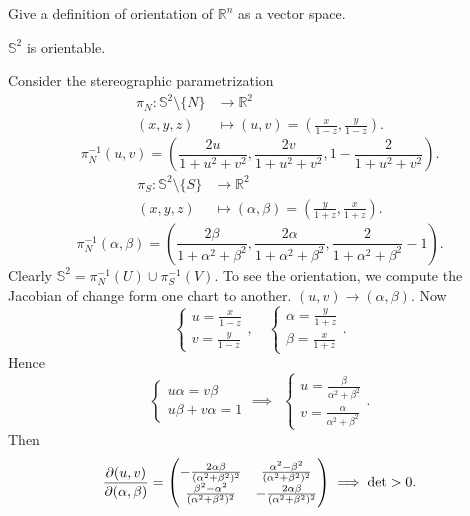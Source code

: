 \begin{exercise}
    Give a definition of orientation of \(\mathbb{R}^n\) as a vector space.
\end{exercise}

\begin{example}[1]
    \(\mathbb{S}^2\) is orientable.
\end{example}

Consider the stereographic parametrization
\begin{align*}
    \pi_N\colon \mathbb{S}^2\setminus\{N\} &\longrightarrow \mathbb{R}^2 \\
    (x,y,z) &\longmapsto (u,v)=(\frac{x}{1-z},\frac{y}{1-z})
.\end{align*} \[
    \pi_N^{-1}(u,v)=(\frac{2u}{1+u^2+v^2},\frac{2v}{1+u^2+v^2},1-\frac{2}{1+u^2+v^2})
.\] \begin{align*}
    \pi_S\colon \mathbb{S}^2\setminus\{S\} &\longrightarrow \mathbb{R}^2 \\
    (x,y,z) &\longmapsto (\alpha,\beta)=(\frac{y}{1+z},\frac{x}{1+z})
.\end{align*} \[
    \pi_N^{-1}(\alpha,\beta)=(\frac{2\beta}{1+\alpha^2+\beta^2},\frac{2\alpha}
    {1+\alpha^2+\beta^2},\frac{2}{1+\alpha^2+\beta^2}-1)
.\] Clearly \(\mathbb{S}^2=\pi_N^{-1}(U)\cup \pi_S^{-1}(V)\). To see the orientation,
we compute the Jacobian of change form one chart to another. \((u,v)\to (\alpha,\beta
)\). Now \[
    \begin{cases}
        u=\frac{x}{1-z} \\
        v=\frac{y}{1-z}
    \end{cases},\quad
    \begin{cases}
        \alpha=\frac{y}{1+z} \\
        \beta=\frac{x}{1+z}
    \end{cases}
.\] Hence \[
    \begin{cases}
        u\alpha=v\beta \\
        u\beta+v\alpha=1
    \end{cases}\implies \ \ 
    \begin{cases}
        u=\frac{\beta}{\alpha^2+\beta^2} \\
        v=\frac{\alpha}{\alpha^2+\beta^2}
    \end{cases}
.\] Then \[
    \pdv{(u,v)}{(\alpha,\beta)}=\begin{pmatrix}
        -\frac{2\alpha\beta}{(\alpha^2+\beta^2)^2} &
        \frac{\alpha^2-\beta^2}{(\alpha^2+\beta^2)^2} \\
        \frac{\beta^2-\alpha^2}{(\alpha^2+\beta^2)^2} &
        -\frac{2\alpha\beta}{(\alpha^2+\beta^2)^2}
    \end{pmatrix}\implies \det>0
.\] 

